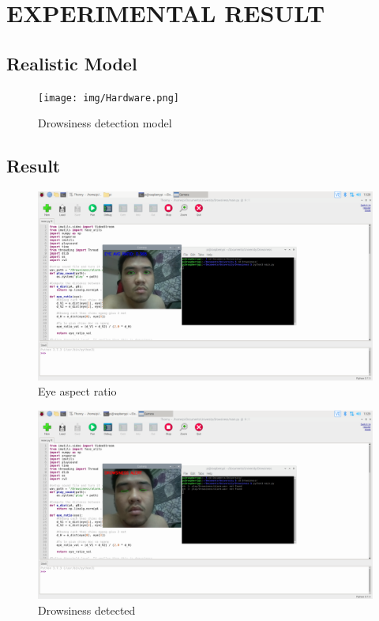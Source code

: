 \chapter{EXPERIMENTAL RESULT}

\renewcommand{\headrulewidth}{0.5pt}
\renewcommand{\footrulewidth}{0.5pt}
\thispagestyle{plain}
\pagestyle{fancy}
\fancyhf{}
\raggedright
{}

\section{Realistic Model}
    \begin{figure}[H]
        \centering
        \texttt{[image: img/Hardware.png]}
        \caption{Drowsiness detection model}
    \end{figure}
\section{Result}
    \begin{figure}[H]
        \centering
        \includegraphics[width=0.6\linewidth]{img/run.png}
        \caption{Eye aspect ratio}
    \end{figure}
    \begin{figure}[H]
        \centering
        \includegraphics[width=0.6\linewidth]{img/result.png}
        \caption{Drowsiness detected}
    \end{figure}